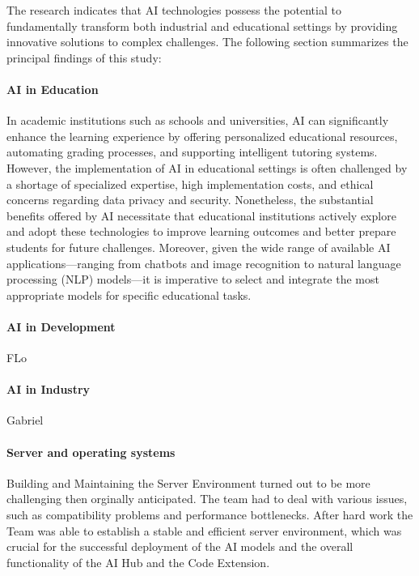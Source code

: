The research indicates that AI technologies possess the potential to fundamentally transform both industrial and educational settings by providing innovative solutions 
to complex challenges. The following section summarizes the principal findings of this study:

\paragraph{AI in Education}

In academic institutions such as schools and universities, AI can significantly enhance the learning experience by offering personalized educational resources, 
automating grading processes, and supporting intelligent tutoring systems. However, the implementation of AI in educational settings is often challenged by a shortage of 
specialized expertise, high implementation costs, and ethical concerns regarding data privacy and security. Nonetheless, 
the substantial benefits offered by AI necessitate that educational institutions actively explore and adopt these technologies 
to improve learning outcomes and better prepare students for future challenges. Moreover, given the wide range of available AI applications—ranging from chatbots and image 
recognition to natural language processing (NLP) models—it is imperative to select and integrate the most appropriate models for specific educational tasks.

\paragraph{AI in Development}

FLo


\paragraph{AI in Industry}

Gabriel

\paragraph{Server and operating systems}

Building and Maintaining the Server Environment turned out to be more challenging then orginally anticipated. The team had to deal with various issues, such as compatibility problems and performance bottlenecks.
After hard work the Team was able to establish a stable and efficient server environment, which was crucial for the successful deployment of the AI models and the overall functionality of the AI Hub and the Code Extension.

